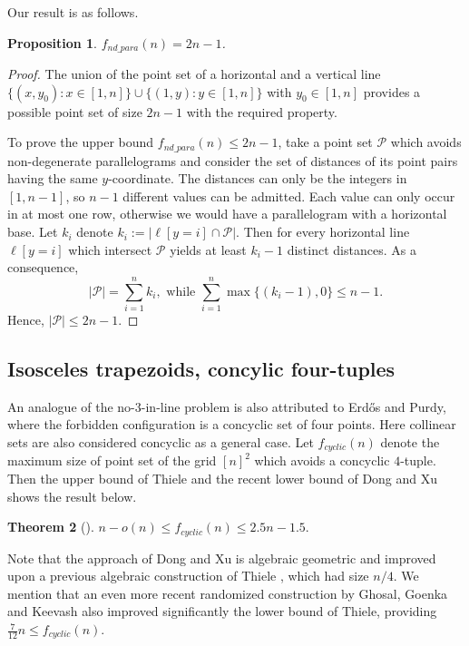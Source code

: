 \documentclass[11pt]{article}
\theoremstyle{plain}
\newtheorem{theorem}{\bf Theorem}[section]
\newtheorem{prop}[theorem]{\bf Proposition}
\newcommand\cP{{\mathcal P}}
\begin{document}
	Our result is as follows.
	
	\begin{prop}\label{nondegpar}
		$f_{nd\_para}(n)=2n-1$.
	\end{prop}
	\begin{proof} The union of the point set of a horizontal and a vertical line $\{(x,y_0): x\in [1,n]\}\cup \{(1,y): y\in [1,n]\}$ with $ y_0 \in [1,n]$ provides a possible point set of size $2n-1$ with the required property.
		
		To prove the upper bound $f_{nd\_para}(n)\le 2n-1$, take a point set $\cP$  which avoids non-degenerate parallelograms and  consider the set of distances of its point pairs having the same $y$-coordinate.  The distances can only be the integers in $[1, n-1]$, so $n-1$ different values can be admitted. Each value can only occur in at most one row, otherwise we would have a parallelogram with a horizontal base. Let $k_i$ denote $k_i:=|\ell[y=i]\cap \cP|$. Then for every horizontal line $\ell[y=i]$ which intersect $\cP$ yields at least $k_i-1$ distinct distances.   As a consequence, $$|\cP|=\sum_{i=1}^n k_i, \text{ \ \  while \ \ }\sum_{i=1}^n \max\{(k_i-1), 0\}\le n-1.$$
		Hence, $|\cP|\le 2n-1$.
	\end{proof}
	
	
	
	\subsection{Isosceles trapezoids, concylic four-tuples}
	
	An analogue of the no-$3$-in-line problem is also attributed to  Erdős and Purdy, where the forbidden configuration is a concyclic  set of four points. Here collinear sets are also considered concyclic as a general case. Let $f_{cyclic}(n)$ denote the maximum size of point set of the grid $[n]^2$ which  avoids a concyclic $4$-tuple. Then the upper bound of Thiele \cite{Thiele2} and the recent lower bound of Dong and Xu \cite{Dong} shows the result below.
	
	\begin{theorem}[\cite{Thiele2, Dong}]
		$n-o(n)\le f_{cyclic}(n)\le 2.5n-1.5.$
	\end{theorem}
	
	Note that the approach of Dong and Xu is algebraic geometric and improved upon a  previous algebraic construction of Thiele \cite{Thiele}, which had size $n/4$. We  mention that an even more recent randomized construction by Ghosal, Goenka and Keevash \cite{Keevash} also improved significantly the  lower bound of Thiele, providing $\frac{7}{12}n\le f_{cyclic}(n)$.
	
\end{document}
